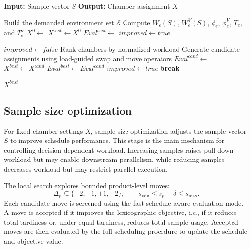 \documentclass[11pt]{article}
\begin{document}
\begin{algorithm}[H]
\caption{Chamber Assignment with Local Refinement}
\label{alg:chamber_assignment_ls}
\begin{algorithmic}[1]
\State \textbf{Input:} Sample vector $S$
\State \textbf{Output:} Chamber assignment $X$

\State Build the demanded environment set $\mathcal{E}$
\State Compute $W_e(S)$, $W_e^V(S)$, $\phi_e$, $\phi_e^V$, $T_e$, and $T_e^V$
\State $X^0 \gets$ 
\State $X^{best}\gets X^0$
\State $Eval^{best}\gets$ 
\State $improved\gets true$

    \State $improved\gets false$
    \State Rank chambers by normalized workload
    \State Generate candidate assignments using load-guided swap and move operators
            \State $Eval^{cand}\gets$ 
                \State $X^{best}\gets X^{cand}$
                \State $Eval^{best}\gets Eval^{cand}$
                \State $improved\gets true$
                \State \textbf{break}
            \EndIf
        \EndIf
    \EndFor
\EndWhile

\State \Return $X^{best}$
\end{algorithmic}
\end{algorithm}

\subsection{Sample size optimization}
\label{subsec:sample_optimization}

For fixed chamber settings \(X\), sample-size optimization adjusts the sample vector \(S\) to improve schedule performance. This stage is the main mechanism for controlling decision-dependent workload. Increasing samples raises pull-down workload but may enable downstream parallelism, while reducing samples decreases workload but may restrict parallel execution.

The local search explores bounded product-level moves:
\[
\Delta_p \subseteq \{-2,-1,+1,+2\},
\qquad
s_{\min}\le s_p+\delta\le s_{\max}.
\]
Each candidate move is screened using the fast schedule-aware evaluation mode. A move is accepted if it improves the lexicographic objective, i.e., if it reduces total tardiness or, under equal tardiness, reduces total sample usage. Accepted moves are then evaluated by the full scheduling procedure to update the schedule and objective value.
\end{document}
